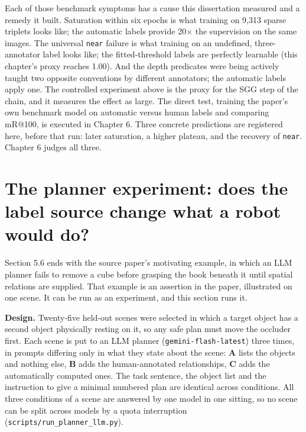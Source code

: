 Each of those benchmark symptoms has a cause this dissertation measured and a remedy it built. Saturation within six epochs is what training on 9,313 sparse triplets looks like; the automatic labels provide 20$\times$ the supervision on the same images. The universal \texttt{near} failure is what training on an undefined, three-annotator label looks like; the fitted-threshold labels are perfectly learnable (this chapter's proxy reaches 1.00). And the depth predicates were being actively taught two opposite conventions by different annotators; the automatic labels apply one. The controlled experiment above is the proxy for the SGG step of the chain, and it measures the effect as large. The direct test, training the paper's own benchmark model on automatic versus human labels and comparing mR@100, is executed in Chapter 6. Three concrete predictions are registered here, before that run: later saturation, a higher plateau, and the recovery of \texttt{near}. Chapter 6 judges all three.

\section{The planner experiment: does the label source change what a robot would do?}

Section 5.6 ends with the source paper's motivating example, in which an LLM planner fails to remove a cube before grasping the book beneath it until spatial relations are supplied. That example is an assertion in the paper, illustrated on one scene. It can be run as an experiment, and this section runs it.

\textbf{Design.} Twenty-five held-out scenes were selected in which a target object has a second object physically resting on it, so any safe plan must move the occluder first. Each scene is put to an LLM planner (\texttt{gemini-flash-latest}) three times, in prompts differing only in what they state about the scene: \textbf{A} lists the objects and nothing else, \textbf{B} adds the human-annotated relationships, \textbf{C} adds the automatically computed ones. The task sentence, the object list and the instruction to give a minimal numbered plan are identical across conditions. All three conditions of a scene are answered by one model in one sitting, so no scene can be split across models by a quota interruption (\texttt{scripts/run\_planner\_llm.py}).

